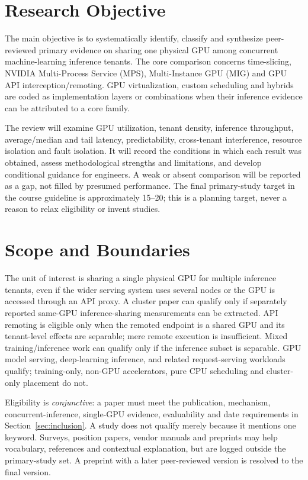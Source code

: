 \documentclass[12pt,a4paper]{article}
\begin{document}
\section{Research Objective}
The main objective is to systematically identify, classify and synthesize peer-reviewed primary evidence on sharing one physical GPU among concurrent machine-learning inference tenants. The core comparison concerns time-slicing, NVIDIA Multi-Process Service (MPS), Multi-Instance GPU (MIG) and GPU API interception/remoting. GPU virtualization, custom scheduling and hybrids are coded as implementation layers or combinations when their inference evidence can be attributed to a core family.

The review will examine GPU utilization, tenant density, inference throughput, average/median and tail latency, predictability, cross-tenant interference, resource isolation and fault isolation. It will record the conditions in which each result was obtained, assess methodological strengths and limitations, and develop conditional guidance for engineers. A weak or absent comparison will be reported as a gap, not filled by presumed performance. The final primary-study target in the course guideline is approximately 15--20; this is a planning target, never a reason to relax eligibility or invent studies.

\section{Scope and Boundaries}
The unit of interest is sharing a single physical GPU for multiple inference tenants, even if the wider serving system uses several nodes or the GPU is accessed through an API proxy. A cluster paper can qualify only if separately reported same-GPU inference-sharing measurements can be extracted. API remoting is eligible only when the remoted endpoint is a shared GPU and its tenant-level effects are separable; mere remote execution is insufficient. Mixed training/inference work can qualify only if the inference subset is separable. GPU model serving, deep-learning inference, and related request-serving workloads qualify; training-only, non-GPU accelerators, pure CPU scheduling and cluster-only placement do not.

Eligibility is \emph{conjunctive}: a paper must meet the publication, mechanism, concurrent-inference, single-GPU evidence, evaluability and date requirements in Section~\ref{sec:inclusion}. A study does not qualify merely because it mentions one keyword. Surveys, position papers, vendor manuals and preprints may help vocabulary, references and contextual explanation, but are logged outside the primary-study set. A preprint with a later peer-reviewed version is resolved to the final version.
\end{document}
